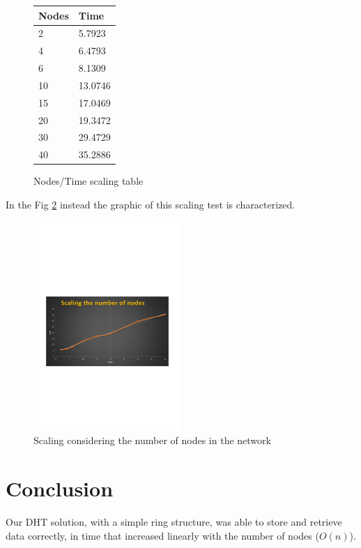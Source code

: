 \documentclass[11pt,conference]{IEEEtran}
\begin{document}
\begin{figure}[h!]
\centering
\caption{Nodes/Time scaling table}
\begin{tabular}[H]{ | l | l | }
\hline
	Nodes & Time \\ \hline
	2 & 5.7923 \\ \hline
	4 & 6.4793 \\ \hline
	6 & 8.1309 \\ \hline
	10 & 13.0746 \\ \hline
	15 & 17.0469 \\ \hline
	20 & 19.3472 \\ \hline
	30 & 29.4729 \\ \hline
	40 & 35.2886 \\ \hline
\end{tabular}
\label{tab:scaling}
\end{figure}

In the Fig \ref{fig:scaling} instead the graphic of this scaling test is characterized.

\begin{figure}[h!]
  \centering
    \includegraphics[trim=0cm 9cm 0cm 11cm, width=0.5\textwidth]{scaling}
    \caption{Scaling considering the number of nodes in the network}
    \label{fig:scaling}
\end{figure}


\section{Conclusion}

Our DHT solution, with a simple ring structure, was able to store and retrieve
data correctly, in time that increased linearly with the number of nodes
($O(n)$).




\end{document}
